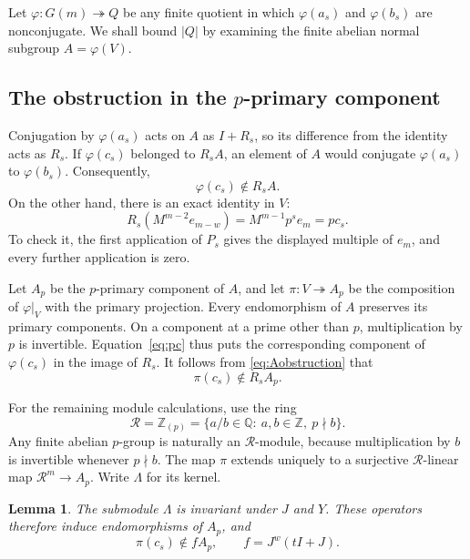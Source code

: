 \documentclass[11pt,letterpaper]{amsart}
\numberwithin{equation}{section}
\newtheorem{lemma}[theorem]{Lemma}
\theoremstyle{remark}
\newcommand{\Z}{\mathbb Z}
\newcommand{\Q}{\mathbb Q}
\begin{document}
Let $\varphi:G(m)\twoheadrightarrow Q$ be any finite quotient in which
$\varphi(a_s)$ and $\varphi(b_s)$ are nonconjugate. We shall bound
$|Q|$ by examining the finite abelian normal subgroup
$A=\varphi(V)$.

\subsection{The obstruction in the \texorpdfstring{$p$}{p}-primary component}

Conjugation by $\varphi(a_s)$ acts on $A$ as $I+R_s$, so its
difference from the identity acts as $R_s$. If $\varphi(c_s)$ belonged
to $R_sA$, an element of $A$ would conjugate $\varphi(a_s)$ to
$\varphi(b_s)$. Consequently,
\begin{equation}\label{eq:Aobstruction}
 \varphi(c_s)\notin R_sA.
\end{equation}
On the other hand, there is an exact identity in $V$:
\begin{equation}\label{eq:pc}
 R_s(M^{m-2}e_{m-w})=M^{m-1}p^s e_m=p c_s.
\end{equation}
To check it, the first application of $P_s$ gives the displayed
multiple of $e_m$, and every further application is zero.

Let $A_p$ be the $p$-primary component of $A$, and let
$\pi:V\twoheadrightarrow A_p$ be the composition of $\varphi|_V$
with the primary projection. Every endomorphism of $A$ preserves its
primary components. On a component at a prime other than $p$,
multiplication by $p$ is invertible. Equation~\eqref{eq:pc} thus puts
the corresponding component of $\varphi(c_s)$ in the image of $R_s$.
It follows from \eqref{eq:Aobstruction} that
\begin{equation}\label{eq:pobstruction}
 \pi(c_s)\notin R_sA_p.
\end{equation}

For the remaining module calculations, use the ring
\[
 \mathcal R=\Z_{(p)}
 =\{a/b\in\Q:\ a,b\in\Z,\ p\nmid b\}.
\]
Any finite abelian $p$-group is naturally an $\mathcal R$-module,
because multiplication by $b$ is invertible whenever $p\nmid b$.
The map $\pi$ extends uniquely to a surjective $\mathcal R$-linear map
$\mathcal R^m\to A_p$. Write $\Lambda$ for its kernel.

\begin{lemma}\label{lem:descent}
The submodule $\Lambda$ is invariant under $J$ and $Y$. These
operators therefore induce endomorphisms of $A_p$, and
\begin{equation}\label{eq:fobstruction}
 \pi(c_s)\notin fA_p,\qquad f=J^w(tI+J).
\end{equation}
\end{lemma}
\end{document}
